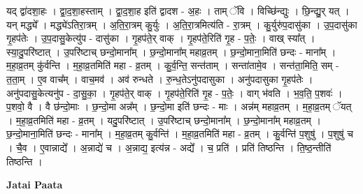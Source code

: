 \documentclass[17pt]{extarticle}
\begin{document}
यद् द्वा॑दशा॒हः । द्वा॒द॒शा॒हस्ताम् । द्वा॒द॒शा॒ह इति॑ द्वादश - अ॒हः । ताम् ॅवि । विच्छि॑न्द्युः । छि॒न्द्यु॒र् यत् । यन् मद्ध्ये᳚ । मद्ध्ये॑ऽतिरा॒त्रम् । अ॒ति॒रा॒त्रम् कु॒र्युः । अ॒ति॒रा॒त्रमित्य॑ति - रा॒त्रम् । कु॒र्युरु॑प॒दासु॑का । उ॒प॒दासु॑का गृ॒हप॑तेः । उ॒प॒दासु॒केत्यु॑प - दासु॑का । गृ॒हप॑ते॒र् वाक् । गृ॒हप॑ते॒रिति॑ गृ॒ह - प॒तेः॒ । वाख् स्या᳚त् । स्या॒दु॒परि॑ष्टात् । उ॒परि॑ष्टाच् छन्दो॒माना᳚म् । छ॒न्दो॒माना᳚म् महाव्र॒तम् । छ॒न्दो॒माना॒मिति॑ छन्दः - माना᳚म् । म॒हा॒व्र॒तम् कु॑र्वन्ति । म॒हा॒व्र॒तमिति॑ महा - व्र॒तम् । कु॒र्व॒न्ति॒ सन्त॑ताम् । सन्ता॑तामे॒व । सन्त॑ता॒मिति॒ सम् - त॒ता॒म् । ए॒व वाच᳚म् । वाच॒मव॑ । अव॑ रुन्धते । रु॒न्ध॒तेऽनु॑पदासुका । अनु॑पदासुका गृ॒हप॑तेः । अनु॑पदासु॒केत्यनु॑प - दा॒सु॒का॒ । गृ॒हप॑ते॒र् वाक् । गृ॒हप॑ते॒रिति॑ गृ॒ह - प॒तेः॒ । वाग् भ॑वति । भ॒व॒ति॒ प॒शवः॑ । प॒शवो॒ वै । वै छ॑न्दो॒माः । छ॒न्दो॒मा अन्न᳚म् । छ॒न्दो॒मा इति॑ छन्दः - माः । अन्न॑म् महाव्र॒तम् । म॒हा॒व्र॒तम् ॅयत् । म॒हा॒व्र॒तमिति॑ महा - व्र॒तम् । यदु॒परि॑ष्टात् । उ॒परि॑ष्टाच् छन्दो॒माना᳚म् । छ॒न्दो॒माना᳚म् महाव्र॒तम् । छ॒न्दो॒माना॒मिति॑ छन्दः - माना᳚म् । म॒हा॒व्र॒तम् कु॒र्वन्ति॑ । म॒हा॒व्र॒तमिति॑ महा - व्र॒तम् । कु॒र्वन्ति॑ प॒शुषु॑ । प॒शुषु॑ च । चै॒व । ए॒वान्नाद्ये᳚ । अ॒न्नाद्ये॑ च । अ॒न्नाद्य॒ इत्य॑न्न - अद्ये᳚ । च॒ प्रति॑ । प्रति॑ तिष्ठन्ति । ति॒ष्ठ॒न्तीति॑ तिष्ठन्ति । \newline

\textbf{Jatai Paata} \newline
\end{document}
